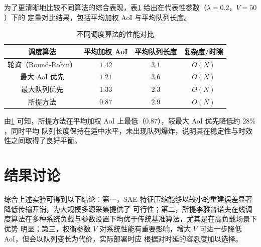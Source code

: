 为了更清晰地比较不同算法的综合表现，表\cref{tab:compare} 给出在代表性参数（$\lambda=0.2$，$V=50$）下的
定量对比结果，包括平均加权 AoI 与平均队列长度。

\begin{table}[ht!]
  \centering
  \caption{不同调度算法的性能对比}\label{tab:compare}
  \begin{tabular}{cccc}
    \toprule
    调度算法 & 平均加权 AoI & 平均队列长度 & 复杂度/时隙 \\
    \midrule
    轮询（Round-Robin） & $1.42$   & $3.1$   & $O(N)$ \\
    最大 AoI 优先       & $1.21$   & $3.6$   & $O(N)$ \\
    最大队列优先         & $1.33$   & $2.3$   & $O(N)$ \\
    所提方法            & $\mathbf{0.87}$ & $2.9$ & $O(N)$ \\
    \bottomrule
  \end{tabular}
\end{table}

由\cref{tab:compare} 可知，所提方法在平均加权 AoI 上最低（$0.87$），较最大 AoI 优先降低约 $28\%$，同时平均
队列长度保持在适中水平，未出现队列爆炸，说明其在稳定性与时效性之间取得了良好平衡。

\section{结果讨论}

综合上述实验可得到以下结论：第一，SAE 特征压缩能够以较小的重建误差显著降低传输开销，为大规模多源采集提供了
可行性；第二，所提李雅普诺夫在线调度算法在多种系统负载与参数设置下均优于传统基准算法，尤其是在高负载场景下优势
明显；第三，权衡参数 $V$ 对系统性能有重要影响，增大 $V$ 可进一步降低 AoI，但会以队列变长为代价，实际部署时应
根据对时延的容忍度加以选择。
